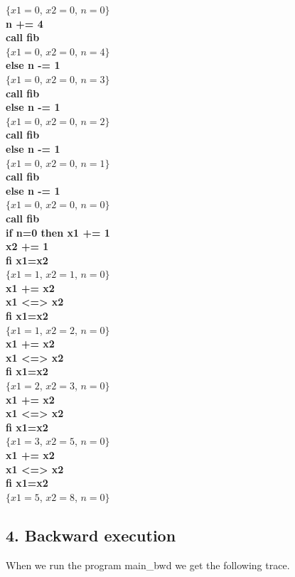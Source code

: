 \documentclass[12pt]{report}
\begin{document}
$ \{x1=0$, $x2=0$, $n=0 \} $ \\
  \textbf{ n += 4 }\\
  \textbf{ call fib }\\
$ \{x1=0$, $x2=0$, $n=4 \} $ \\
  \textbf{else n -= 1} \\
$ \{x1=0$, $x2=0$, $n=3 \} $ \\
  \textbf{call fib} \\
 \textbf{else n -= 1} \\
$ \{x1=0$, $x2=0$, $n=2 \} $ \\
  \textbf{call fib} \\
  \textbf{else n -= 1} \\
$ \{x1=0$, $x2=0$, $n=1 \} $ \\
  \textbf{call fib} \\
  \textbf{else n -= 1} \\
$ \{x1=0$, $x2=0$, $n=0 \} $ \\
  \textbf{call fib} \\
  \textbf{if n=0 then x1 += 1} \\
  \textbf{x2 += 1} \\
  \textbf{fi x1=x2} \\
$ \{x1=1$, $x2=1$, $n=0 \} $ \\
  \textbf{x1 += x2} \\
  \textbf{x1 <=> x2} \\
  \textbf{fi x1=x2} \\
$ \{x1=1$, $x2=2$, $n=0 \} $ \\
  \textbf{x1 += x2} \\
  \textbf{x1 <=> x2} \\
  \textbf{fi x1=x2} \\
$ \{x1=2$, $x2=3$, $n=0 \} $ \\
  \textbf{x1 += x2} \\
  \textbf{x1 <=> x2} \\
  \textbf{fi x1=x2} \\
$ \{x1=3$, $x2=5$, $n=0 \} $ \\
  \textbf{x1 += x2} \\
  \textbf{x1 <=> x2} \\
  \textbf{fi x1=x2} \\
$ \{x1=5$, $x2=8$, $n=0 \} $ \\

\subsection*{4. Backward execution}
When we run the program main\_bwd we get the following trace.
\end{document}
